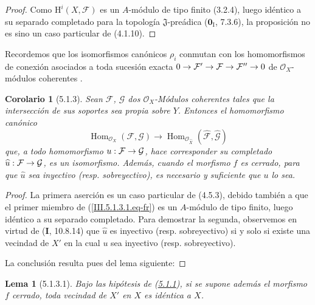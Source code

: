 \documentclass[10pt,oneside,openany]{book}
\theoremstyle{egaenv}\newtheorem*{env}{---}
\theoremstyle{egastatement}
\newtheorem*{lemma}{Lema}
\newtheorem*{corollary}{Corolario}
\theoremstyle{egadescription}
\newcommand{\oldpage}[2][]{\marginnote{\normalfont\scriptsize\textbf{#1}\,|\,#2}\ignorespaces}
\renewcommand{\to}{\mathchoice{\longrightarrow}{\rightarrow}{\rightarrow}{\rightarrow}}
\begin{document}
\begin{proof}
Como $\mathrm H^i(X,\mathcal F)$ es un $A$-módulo de tipo finito (3.2.4), luego
idéntico a su separado completado para la topología $\mathfrak J$-preádica
($\mathbf{0}_{\mathrm I}$, 7.3.6), la proposición no es sino un caso particular de (4.1.10).
\end{proof}

Recordemos que los isomorfismos canónicos $\rho_i$ conmutan con los
homomorfismos de conexión asociados a toda sucesión exacta
$0\to\mathcal F'\to\mathcal F\to\mathcal F''\to0$
de $\mathcal O_X$-módulos coherentes
 .

\begin{corollary}[5.1.3]
\label{III.5.1.3-fr}
Sean $\mathcal F$, $\mathcal G$ dos $\mathcal O_X$-Módulos coherentes tales que
la intersección de sus soportes sea propia sobre $Y$. Entonces el homomorfismo canónico
\begin{equation}
\operatorname{Hom}_{\mathcal O_X}(\mathcal F,\mathcal G)
\longrightarrow
\operatorname{Hom}_{\mathcal O_{\widehat X}}
(\widehat{\mathcal F},\widehat{\mathcal G})
\tag{5.1.3.1}
\label{III.5.1.3.1.eq-fr}
\end{equation}
que, a todo homomorfismo $u:\mathcal F\to\mathcal G$, hace corresponder su
completado $\widehat u:\mathcal F\to\mathcal G$, es un
isomorfismo. Además, cuando el morfismo $f$ es cerrado, para que $\widehat u$ sea
inyectivo (\textup{resp.} sobreyectivo), es necesario y suficiente que $u$ lo sea.
\end{corollary}

\begin{proof}
La primera aserción es un caso particular de (4.5.3), debido también a que el
primer miembro de (\ref{III.5.1.3.1.eq-fr}) es un $A$-módulo de tipo finito, luego
idéntico a su separado completado. Para demostrar la segunda, observemos en virtud de
(\textbf{I}, 10.8.14) que $\widehat u$ es inyectivo (resp. sobreyectivo) si y solo si existe
una vecindad de $X'$ en la cual $u$ sea inyectivo (resp. sobreyectivo).

\oldpage[III]{150}
La conclusión
resulta pues del lema siguiente:
\end{proof}

\begin{lemma}[5.1.3.1]
\label{III.5.1.3.1-fr}
Bajo las hipótesis de \textup{(\hyperref[III.5.1.1-fr]{5.1.1})}, si se supone además el
morfismo $f$ cerrado, toda vecindad de $X'$ en $X$ es idéntica a $X$.
\end{lemma}
\end{document}
